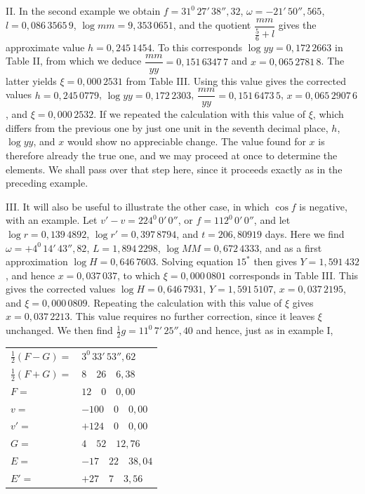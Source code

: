 II. In the second example we obtain $f=31^0\,27'\,38''{,}32$, $\omega=-21'\,50''{,}565$, $l=0{,}086\,3565\,9$, $\log mm=9{,}353\,0651$, and the quotient $\dfrac{mm}{\frac56+l}$ gives the approximate value $h=0{,}245\,1454$. To this corresponds $\log yy=0{,}172\,2663$ in Table II, from which we deduce $\dfrac{mm}{yy}=0{,}151\,6347\,7$ and $x=0{,}065\,2781\,8$. The latter yields $\xi=0{,}000\,2531$ from Table III. Using this value gives the corrected values $h=0{,}245\,0779$, $\log yy=0{,}172\,2303$, $\dfrac{mm}{yy}=0{,}151\,6473\,5$, $x=0{,}065\,2907\,6$, and $\xi=0{,}000\,2532$. If we repeated the calculation with this value of $\xi$, which differs from the previous one by just one unit in the seventh decimal place, $h$, $\log yy$, and $x$ would show no appreciable change. The value found for $x$ is therefore already the true one, and we may proceed at once to determine the elements. We shall pass over that step here, since it proceeds exactly as in the preceding example.

III. It will also be useful to illustrate the other case, in which $\cos f$ is negative, with an example. Let $v'-v=224^0\,0'\,0''$, or $f=112^0\,0'\,0''$, and let $\log r=0{,}139\,4892$, $\log r'=0{,}397\,8794$, and $t=206{,}80919$ days. Here we find $\omega=+4^0\,14'\,43''{,}82$, $L=1{,}894\,2298$, $\log MM=0{,}672\,4333$, and as a first approximation $\log H=0{,}646\,7603$. Solving equation $15^*$ then gives $Y=1{,}591\,432$, and hence $x=0{,}037\,037$, to which $\xi=0{,}000\,0801$ corresponds in Table III. This gives the corrected values $\log H=0{,}646\,7931$, $Y=1{,}591\,5107$, $x=0{,}037\,2195$, and $\xi=0{,}000\,0809$. Repeating the calculation with this value of $\xi$ gives $x=0{,}037\,2213$. This value requires no further correction, since it leaves $\xi$ unchanged. We then find $\tfrac12 g=11^0\,7'\,25''{,}40$ and hence, just as in example I,

\begin{center}
\begin{tabular}{@{}ll@{}}
$\tfrac12(F-G)=$ & $3^0\,33'\,53''{,}62$\\[.3em]
$\tfrac12(F+G)=$ & $8\quad26\quad6{,}38$\\[.3em]
$F=$ & $12\quad0\quad0{,}00$\\[.3em]
$v=$ & $-100\quad0\quad0{,}00$\\[.3em]
$v'=$ & $+124\quad0\quad0{,}00$\\[.3em]
$G=$ & $4\quad52\quad12{,}76$\\[.3em]
$E=$ & $-17\quad22\quad38{,}04$\\[.3em]
$E'=$ & $+27\quad7\quad3{,}56$\\[.3em]
\end{tabular}
\end{center}

